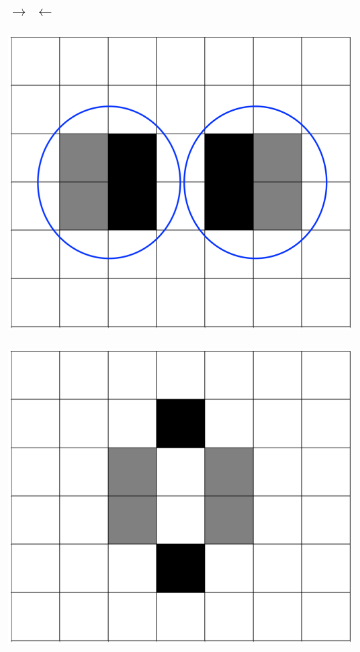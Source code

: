 \documentclass[12pt]{article}
\numberwithin{figure}{section} %
\begin{document}
\begin{figure}[H]
	\centering
	\begin{subfigure}[t]{0.06\textwidth}
	\centering
		{\LARGE$\xrightarrow{}$}
		\hspace{0.1cm}
		{\LARGE$\xleftarrow{}$}
  	\end{subfigure}	
	\centering
	\begin{subfigure}{0.22\textwidth}
     		\centering
     		\includegraphics[width=\linewidth]{Section4/31.0}
     		\subcaption{}
   	\end{subfigure}
    	\begin{subfigure}{0.22\textwidth}
     		\centering
     		\includegraphics[width=\linewidth]{Section4/31.1}

\end{subfigure}
\end{figure}
\end{document}
